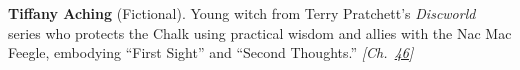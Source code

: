 \textbf{Tiffany Aching} (Fictional). Young witch from Terry Pratchett's \emph{Discworld} series who protects the Chalk using practical wisdom and allies with the Nac Mac Feegle, embodying ``First Sight'' and ``Second Thoughts.'' \emph{[Ch.~\hyperref[ch:woodwardhoffmannrules]{46}]}

